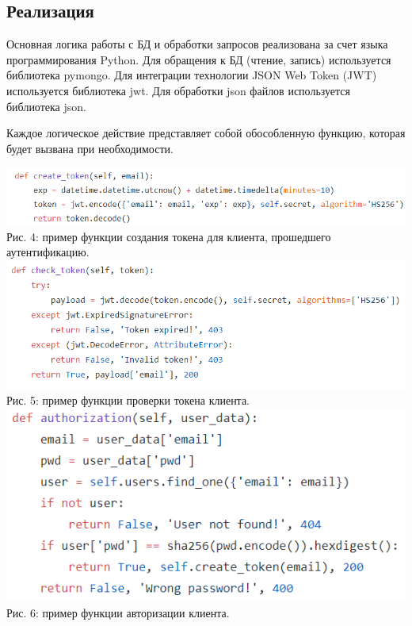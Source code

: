 \documentclass[14pt, a4paper]{extarticle}
\begin{document}
    \newpage
    \subsection{Реализация}
    Основная логика работы с БД и обработки запросов реализована за счет языка программирования Python. Для обращения к БД (чтение, запись) используется библиотека pymongo. Для интеграции технологии JSON Web Token (JWT) используется библиотека jwt. Для обработки json файлов используется библиотека json.

    Каждое логическое действие представляет собой обособленную функцию, которая будет вызвана при необходимости.
    \begin{center}
        \includegraphics[width=\textwidth]{img/create_token.png}\\
        Рис. 4: пример функции создания токена для клиента, прошедшего аутентификацию.\\[\baselineskip]
        \includegraphics[scale=0.6]{img/check_token.png}\\
        Рис. 5: пример функции проверки токена клиента.\\[\baselineskip]
        \includegraphics[scale=0.6]{img/authorization.png}\\
        Рис. 6: пример функции авторизации клиента.\\[\baselineskip]
    \end{center}
\end{document}
